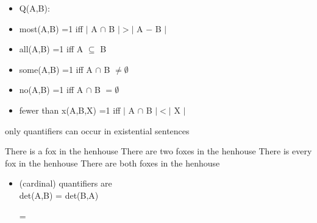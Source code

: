 \documentclass[headrule,footrule]{foils}
\begin{document}

\begin{itemize}
\item Q(A,B): 
\item most(A,B) =1 iff $|$ A $\cap$ B $| > |$ A $-$ B $|$ 
\item all(A,B) =1 iff  A $\subseteq$ B  
\item some(A,B) =1 iff  A $\cap$ B $\ne \emptyset$ 
\item no(A,B) =1 iff A $\cap$ B  $= \emptyset$ 
\item fewer than x(A,B,X) =1 iff $|$ A $\cap$ B $| <  |$ X $|$ 
\end{itemize}


\begin{exe}
  \ex only  quantifiers can occur in existential  sentences
  \begin{xlist}
    \ix There is a fox in the henhouse
    \ix There are two foxes in the henhouse
    \ix *There is every fox in the henhouse
    \ix *There are both foxes in the henhouse
  \end{xlist}
\end{exe}
\begin{itemize}
\item {} (cardinal) quantifiers are 
  \\ det(A,B) = det(B,A)
  \begin{exe}
    \ex {}   = 
  \end{exe}
\end{itemize}

\end{document}
